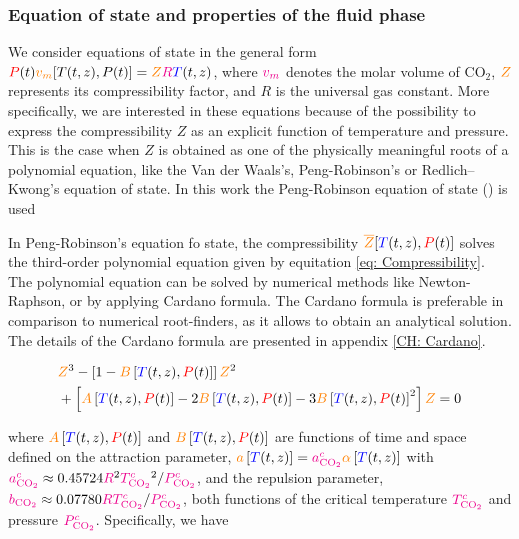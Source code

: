 \documentclass[../Article_Model_Parameters.tex]{subfiles}
\begin{document}
	
	\label{CH: Thermodynamic_details}
	
	\subsubsection{Equation of state and properties of the fluid phase} \label{subsubsec: Equation of state}
	We consider equations of state in the general form ${\color{red}P}(t) {\color{orange}v_m}[T(t,z),P(t)] = {\color{orange}Z}{\color{magenta}R}{\color{blue}T}(t,z)$, where ${\color{magenta}v_m}$ denotes the molar volume of $\text{CO}_2$, ${\color{orange}Z}$ represents its compressibility factor, and $R$ is the universal gas constant. More specifically, we are interested in these equations because of the possibility to express the compressibility $Z$ as an explicit function of temperature and pressure. This is the case when $Z$ is obtained as one of the physically meaningful roots of a polynomial equation, like the Van der Waals's, Peng-Robinson's or Redlich–Kwong's equation of state. In this work the Peng-Robinson equation of state (\citet{Peng1976}) is used 
	
	In Peng-Robinson's equation fo state, the compressibility ${\color{orange}\overline{Z}}[{\color{blue}T}(t,z), {\color{red}P}(t)]$ solves the third-order polynomial equation given by equitation \ref{eq: Compressibility}. The polynomial equation can be solved by numerical methods like Newton-Raphson, or by applying Cardano formula. The Cardano formula is preferable in comparison to numerical root-finders, as it allows to obtain an analytical solution. The details of the Cardano formula are presented in appendix \ref{CH: Cardano}.
	
	{\footnotesize	
	\begin{align}\label{eq: Compressibility}
		&{\color{orange}Z}^3 - \left[1 - {\color{orange}B}\left[{\color{blue}T}(t,z), {\color{red}P}(t)\right]\right] {\color{orange}Z}^2 \\ \nonumber
		&+ \left[{\color{orange}A}\left[{\color{blue}T}(t,z), {\color{red}P}(t)\right] - 2{\color{orange}B}\left[{\color{blue}T}(t,z), {\color{red}P}(t)\right] - 3{\color{orange}B}\left[{\color{blue}T}(t,z), {\color{red}P}(t)\right]^2\right] {\color{orange}Z} = 0
	\end{align} }

	where ${\color{orange}A}\left[{\color{blue}T}(t,z), {\color{red}P}(t)\right]$ and ${\color{orange}B}\left[{\color{blue}T}(t,z), {\color{red}P}(t)\right]$ are functions of time and space defined on the attraction parameter, ${\color{orange}a}\left[{\color{blue}T}(t,z)\right] = {\color{magenta}a^c_{\text{CO}_2}}{\color{orange}\alpha}\left[{\color{blue}T}(t,z)\right]$ with ${\color{magenta}a^c_{\text{CO}_2}} \approx 0.45724 {{\color{magenta}R}^2{\color{magenta}T^c_{\text{CO}_2}}^2}/{{\color{magenta}P^c_{\text{CO}_2}}}$, and the repulsion parameter, ${\color{magenta}b_{\text{CO}_2}} \approx 0.07780 {{\color{magenta}R}{\color{magenta}T^c_{\text{CO}_2}}}/{{\color{magenta}P^c_{\text{CO}_2}}}$, both functions of the critical temperature ${\color{magenta}T^c_{\text{CO}_2}}$ and pressure ${\color{magenta}P^c_{\text{CO}_2}}$. Specifically, we have
\end{document}
